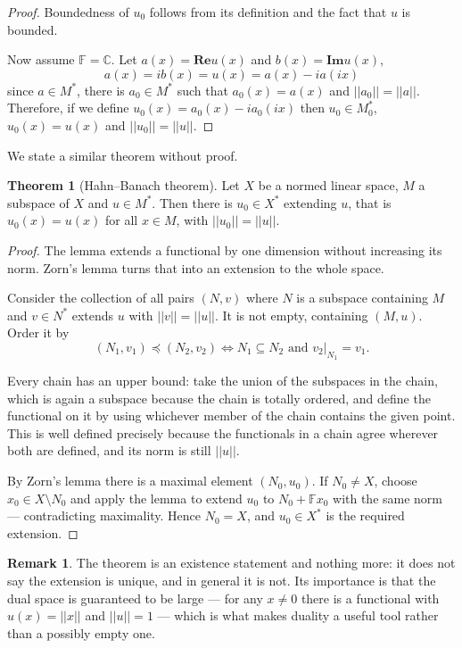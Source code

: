 \documentclass[11pt,a4paper]{article}
\theoremstyle{definition}
\newtheorem{thm}{Theorem}[section]
\newtheorem*{remark}{Remark}
\begin{document}
\begin{proof}
Boundedness of $u_0$ follows from its definition and the fact that $u$ is bounded.

Now assume $\mathbb{F}=\mathbb{C}$. Let $a(x)=\textbf{Re}u(x)$ and $b(x)=\textbf{Im}u(x)$, $$a(x)=ib(x)=u(x)=a(x)-ia(ix)$$ since $a\in M^*$, there is $a_0\in M^*$ such that $a_0(x)=a(x)$ and $||a_0||=||a||$.\\ Therefore, if we define $u_0(x)=a_0(x)-ia_0(ix)$ then $u_0\in M^*_0$, $u_0(x)=u(x)$ and $||u_0||=||u||$.


\end{proof}
We state a similar theorem without proof.


\begin{thm}[Hahn--Banach theorem]
Let $X$ be a normed linear space, $M$ a subspace of $X$ and $u\in M^*$. Then
there is $u_0\in X^*$ extending $u$, that is $u_0(x)=u(x)$ for all $x\in M$,
with $||u_0||=||u||$.
\end{thm}

\begin{proof}
The lemma extends a functional by one dimension without increasing its norm.
Zorn's lemma turns that into an extension to the whole space.

Consider the collection of all pairs $(N,v)$ where $N$ is a subspace containing
$M$ and $v\in N^*$ extends $u$ with $||v||=||u||$. It is not empty, containing
$(M,u)$. Order it by
$$(N_1,v_1)\preceq (N_2,v_2)\iff N_1\subseteq N_2 \text{ and } v_2|_{N_1}=v_1 .$$

Every chain has an upper bound: take the union of the subspaces in the chain,
which is again a subspace because the chain is totally ordered, and define the
functional on it by using whichever member of the chain contains the given
point. This is well defined precisely because the functionals in a chain agree
wherever both are defined, and its norm is still $||u||$.

By Zorn's lemma there is a maximal element $(N_0,u_0)$. If $N_0\neq X$, choose
$x_0\in X\setminus N_0$ and apply the lemma to extend $u_0$ to
$N_0+\mathbb{F}x_0$ with the same norm --- contradicting maximality. Hence
$N_0=X$, and $u_0\in X^*$ is the required extension.
\end{proof}

\begin{remark}
The theorem is an existence statement and nothing more: it does not say the
extension is unique, and in general it is not. Its importance is that the dual
space is guaranteed to be large --- for any $x\neq 0$ there is a functional with
$u(x)=||x||$ and $||u||=1$ --- which is what makes duality a useful tool rather
than a possibly empty one.
\end{remark}
\end{document}
